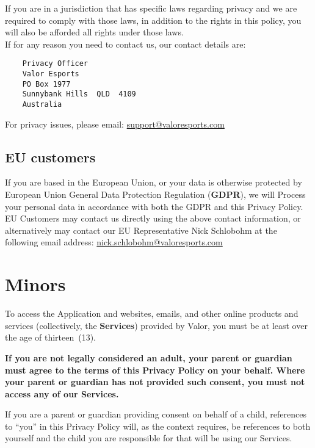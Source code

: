\documentclass[10pt]{article}
\begin{document}
If you are in a jurisdiction that has specific laws regarding privacy and we are required to comply with those laws, in addition to the rights in this policy, you will also be afforded all rights under those laws. \\

If for any reason you need to contact us, our contact details are:

\begin{verbatim}
	Privacy Officer
	Valor Esports
	PO Box 1977
	Sunnybank Hills  QLD  4109
	Australia
\end{verbatim}

For privacy issues, please email: \href{mailto:support@valoresports.com}{support@valoresports.com}

\subsection{EU customers}
If you are based in the European Union, or your data is otherwise protected by European Union General Data Protection Regulation (\textbf{GDPR}), we will Process your personal data in accordance with both the GDPR and this Privacy Policy. \\

EU Customers may contact us directly using the above contact information, or alternatively may contact our EU Representative Nick Schlobohm at the following email address: \href{mailto:nick.schlobohm@valoresports.com}{nick.schlobohm@valoresports.com}


\section{Minors}
To access the Application and websites, emails, and other online products and services (collectively, the \textbf{Services}) provided by Valor, you must be at least over the age of thirteen~(13). \\

\begin{mdframed}[leftmargin=10pt,rightmargin=10pt]
\textbf{If you are not legally considered an adult, your parent or guardian must agree to the terms of this Privacy Policy on your behalf. Where your parent or guardian has not provided such consent, you must not access any of our Services.}
\end{mdframed}

If you are a parent or guardian providing consent on behalf of a child, references to ``you'' in this Privacy Policy will, as the context requires, be references to both yourself and the child you are responsible for that will be using our Services.
\end{document}
